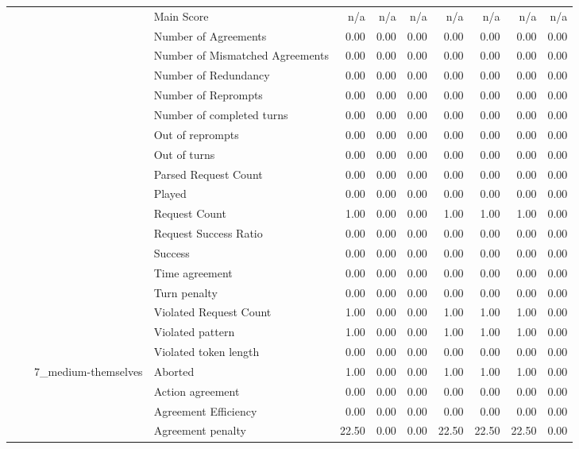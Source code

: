 \begin{tabular}{llllrrrrrrr}
 &  &  & Main Score & n/a & n/a & n/a & n/a & n/a & n/a & n/a \\
 &  &  & Number of Agreements & 0.00 & 0.00 & 0.00 & 0.00 & 0.00 & 0.00 & 0.00 \\
 &  &  & Number of Mismatched Agreements & 0.00 & 0.00 & 0.00 & 0.00 & 0.00 & 0.00 & 0.00 \\
 &  &  & Number of Redundancy & 0.00 & 0.00 & 0.00 & 0.00 & 0.00 & 0.00 & 0.00 \\
 &  &  & Number of Reprompts & 0.00 & 0.00 & 0.00 & 0.00 & 0.00 & 0.00 & 0.00 \\
 &  &  & Number of completed turns & 0.00 & 0.00 & 0.00 & 0.00 & 0.00 & 0.00 & 0.00 \\
 &  &  & Out of reprompts & 0.00 & 0.00 & 0.00 & 0.00 & 0.00 & 0.00 & 0.00 \\
 &  &  & Out of turns & 0.00 & 0.00 & 0.00 & 0.00 & 0.00 & 0.00 & 0.00 \\
 &  &  & Parsed Request Count & 0.00 & 0.00 & 0.00 & 0.00 & 0.00 & 0.00 & 0.00 \\
 &  &  & Played & 0.00 & 0.00 & 0.00 & 0.00 & 0.00 & 0.00 & 0.00 \\
 &  &  & Request Count & 1.00 & 0.00 & 0.00 & 1.00 & 1.00 & 1.00 & 0.00 \\
 &  &  & Request Success Ratio & 0.00 & 0.00 & 0.00 & 0.00 & 0.00 & 0.00 & 0.00 \\
 &  &  & Success & 0.00 & 0.00 & 0.00 & 0.00 & 0.00 & 0.00 & 0.00 \\
 &  &  & Time agreement & 0.00 & 0.00 & 0.00 & 0.00 & 0.00 & 0.00 & 0.00 \\
 &  &  & Turn penalty & 0.00 & 0.00 & 0.00 & 0.00 & 0.00 & 0.00 & 0.00 \\
 &  &  & Violated Request Count & 1.00 & 0.00 & 0.00 & 1.00 & 1.00 & 1.00 & 0.00 \\
 &  &  & Violated pattern & 1.00 & 0.00 & 0.00 & 1.00 & 1.00 & 1.00 & 0.00 \\
 &  &  & Violated token length & 0.00 & 0.00 & 0.00 & 0.00 & 0.00 & 0.00 & 0.00 \\
\cline{3-11}
 &  & \multirow[t]{27}{*}{7_medium-themselves} & Aborted & 1.00 & 0.00 & 0.00 & 1.00 & 1.00 & 1.00 & 0.00 \\
 &  &  & Action agreement & 0.00 & 0.00 & 0.00 & 0.00 & 0.00 & 0.00 & 0.00 \\
 &  &  & Agreement Efficiency & 0.00 & 0.00 & 0.00 & 0.00 & 0.00 & 0.00 & 0.00 \\
 &  &  & Agreement penalty & 22.50 & 0.00 & 0.00 & 22.50 & 22.50 & 22.50 & 0.00 \\

\end{tabular}
